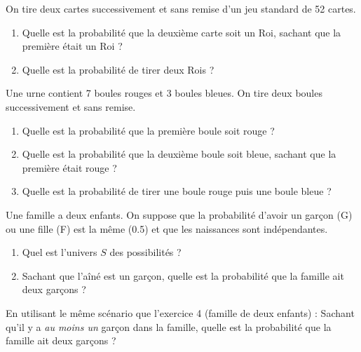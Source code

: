 \begin{exercicebox}
On tire deux cartes successivement et sans remise d'un jeu standard de 52 cartes.
\begin{enumerate}
    \item Quelle est la probabilité que la deuxième carte soit un Roi, sachant que la première était un Roi ?
    \item Quelle est la probabilité de tirer deux Rois ?
\end{enumerate}
\end{exercicebox}

\begin{exercicebox}
Une urne contient 7 boules rouges et 3 boules bleues. On tire deux boules successivement et sans remise.
\begin{enumerate}
    \item Quelle est la probabilité que la première boule soit rouge ?
    \item Quelle est la probabilité que la deuxième boule soit bleue, sachant que la première était rouge ?
    \item Quelle est la probabilité de tirer une boule rouge puis une boule bleue ?
\end{enumerate}
\end{exercicebox}

\begin{exercicebox}
Une famille a deux enfants. On suppose que la probabilité d'avoir un garçon (G) ou une fille (F) est la même (0.5) et que les naissances sont indépendantes.
\begin{enumerate}
    \item Quel est l'univers $S$ des possibilités ?
    \item Sachant que l'aîné est un garçon, quelle est la probabilité que la famille ait deux garçons ?
\end{enumerate}
\end{exercicebox}

\begin{exercicebox}
En utilisant le même scénario que l'exercice 4 (famille de deux enfants) :
Sachant qu'il y a \textit{au moins un} garçon dans la famille, quelle est la probabilité que la famille ait deux garçons ?
\end{exercicebox}


